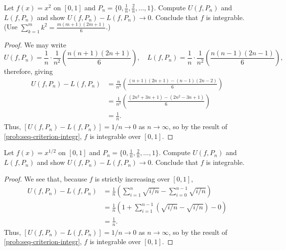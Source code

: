 \begin{problem}
  Let $f(x) = x^{2}$ on $[0,1]$ and $P_{n} = \{0, \frac{1}{n}, \frac{2}{n}, \ldots, 1 \}$. Compute
  $U(f, P_{n})$ and $L(f, P_{n})$ and show $U(f, P_{n}) - L(f, P_{n}) \to 0$. Conclude that $f$ is
  integrable. (Use $\sum_{k=1}^{m} k^{2} = \frac{m(m+1)(2m + 1)}{6}$.)

  \begin{proof}
    We may write
    \[
      U(f, P_{n}) = \frac{1}{n} \cdot \frac{1}{n^{2}} \left( \frac{n(n+1)(2n+1)}{6} \right), \quad L(f, P_{n}) = \frac{1}{n} \cdot \frac{1}{n^{2}} \left( \frac{n(n-1)(2n-1)}{6} \right),
    \]
    therefore, giving
    \begin{align*}
      U(f, P_{n}) - L(f, P_{n}) &= \frac{n}{n^3} \left( \frac{(n+1)(2n+1) - (n-1)(2n-2)}{6} \right)\\
                                &= \frac{1}{n^{2}} \left( \frac{(2n^{2} + 3n + 1) - (2n^{2} - 3n + 1)}{6} \right)\\
                                &= \frac{1}{n}.
    \end{align*}
    Thus, $[U(f, P_{n}) - L(f, P_{n})] = 1/n \to 0$ as $n \to \infty$, so by the result of 
    \ref{prob:seq-criterion-integr}, $f$ is integrable over $[0, 1]$.
  \end{proof}

\end{problem}

\begin{problem}
  Let $f(x) = x^{1/2}$ on $[0,1]$ and $P_{n} = \{0, \frac{1}{n}, \frac{2}{n}, \ldots, 1 \}$. Compute
  $U(f, P_{n})$ and $L(f, P_{n})$ and show $U(f, P_{n}) - L(f, P_{n}) \to 0$. Conclude that $f$ is
  integrable.

  \begin{proof}
    We see that, because $f$ is strictly increasing over $[0, 1]$,
    \begin{align*}
    U(f, P_{n}) - L(f, P_{n}) &= \frac{1}{n} \left( \sum_{i=1}^{n}{\sqrt{i/n}} - \sum_{i=0}^{n-1}{\sqrt{i/n}} \right) \\
                                &= \frac{1}{n} \left( 1 + \sum_{i=1}^{n-1}{(\sqrt{i/n} - \sqrt{i/n})} - 0 \right) \\
                                &= \frac{1}{n}.
    \end{align*}
    Thus, $[U(f, P_{n}) - L(f, P_{n})] = 1/n \to 0$ as $n \to \infty$, so by the result of 
    \ref{prob:seq-criterion-integr}, $f$ is integrable over $[0, 1]$.
  \end{proof}

\end{problem}


